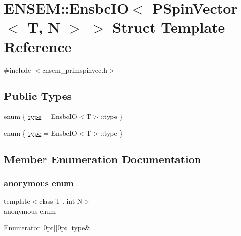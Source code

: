 \hypertarget{structENSEM_1_1EnsbcIO_3_01PSpinVector_3_01T_00_01N_01_4_01_4}{}\section{E\+N\+S\+EM\+:\+:Ensbc\+IO$<$ P\+Spin\+Vector$<$ T, N $>$ $>$ Struct Template Reference}
\label{structENSEM_1_1EnsbcIO_3_01PSpinVector_3_01T_00_01N_01_4_01_4}


{\ttfamily \#include $<$ensem\+\_\+primspinvec.\+h$>$}

\subsection*{Public Types}
\begin{DoxyCompactItemize}
\item 
enum \{ \mbox{\hyperlink{structENSEM_1_1EnsbcIO_3_01PSpinVector_3_01T_00_01N_01_4_01_4_a9dfe5a4ae811ba3afad18150e4dc7562a04e61fa5aa42066e9fedbcc4e35bc62d}{type}} = Ensbc\+IO$<$T$>$\+:\+:type
 \}
\item 
enum \{ \mbox{\hyperlink{structENSEM_1_1EnsbcIO_3_01PSpinVector_3_01T_00_01N_01_4_01_4_a9dfe5a4ae811ba3afad18150e4dc7562a04e61fa5aa42066e9fedbcc4e35bc62d}{type}} = Ensbc\+IO$<$T$>$\+:\+:type
 \}
\end{DoxyCompactItemize}


\subsection{Member Enumeration Documentation}
\mbox{\label{structENSEM_1_1EnsbcIO_3_01PSpinVector_3_01T_00_01N_01_4_01_4_a9dfe5a4ae811ba3afad18150e4dc7562}} 
\subsubsection{\texorpdfstring{anonymous enum}{anonymous enum}}
{\footnotesize\ttfamily template$<$class T , int N$>$ \\
anonymous enum}

\begin{DoxyEnumFields}{Enumerator}
[0pt][0pt]{}\mbox{\label{structENSEM_1_1EnsbcIO_3_01PSpinVector_3_01T_00_01N_01_4_01_4_a9dfe5a4ae811ba3afad18150e4dc7562a04e61fa5aa42066e9fedbcc4e35bc62d}} 
type&\\
\hline

\end{DoxyEnumFields}
\mbox{\label{structENSEM_1_1EnsbcIO_3_01PSpinVector_3_01T_00_01N_01_4_01_4_afb20ac95016d76263b8828a4294d77ba}} 
